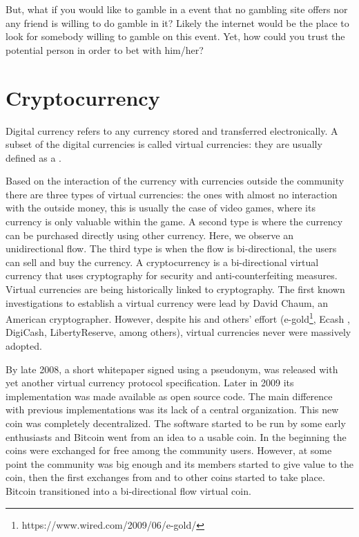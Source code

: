 But, what if you would like to gamble in a event that no gambling site offers
  nor any friend is willing to do gamble in it? Likely the internet would be the
  place to look for somebody willing to gamble on this event. Yet, how could you
  trust the potential person in order to bet with him/her?

\section{Cryptocurrency}
Digital currency refers to any currency stored and transferred
  electronically.
A subset of the digital currencies is called virtual currencies: they are
  usually defined \cite{bcentraleuro} as a .

Based on the interaction of the currency with currencies outside the
  community there are three types of virtual currencies: the ones with almost
  no interaction with the outside money, this is usually the case of video
  games, where its currency is only valuable within the game. A second
  type is where the currency can be purchased directly using other currency.
  Here, we observe an unidirectional flow. The third type is when the flow is
  bi-directional, the users can sell and buy the currency.
A cryptocurrency is a bi-directional virtual currency that uses cryptography
  for security and anti-counterfeiting measures. Virtual currencies are being
  historically linked to cryptography. The first known investigations
  \cite{chaum1983blind} to establish a virtual currency were lead by David
  Chaum, an American cryptographer. However, despite his and others' effort
  (e-gold\footnote{https://www.wired.com/2009/06/e-gold/},
  Ecash \cite{chaum1990untraceable},
  DigiCash, LibertyReserve, among others), virtual currencies never were
  massively adopted.

By late 2008, a short whitepaper \cite{nakamoto2008bitcoin} signed using a
  pseudonym, was released with yet another virtual currency protocol
  specification. Later in 2009 its implementation was made available as open
  source code. The main difference with previous implementations was its lack of
  a central organization. This new coin was completely decentralized.
The software started to be run by some early enthusiasts and Bitcoin went from
  an idea to a usable coin.
In the beginning the coins were exchanged for free among the community users.
However, at some point the community was big enough and its members started
  to give value to the coin, then the first exchanges from and to other coins
  started to take place. Bitcoin transitioned into a bi-directional flow
  virtual coin.

